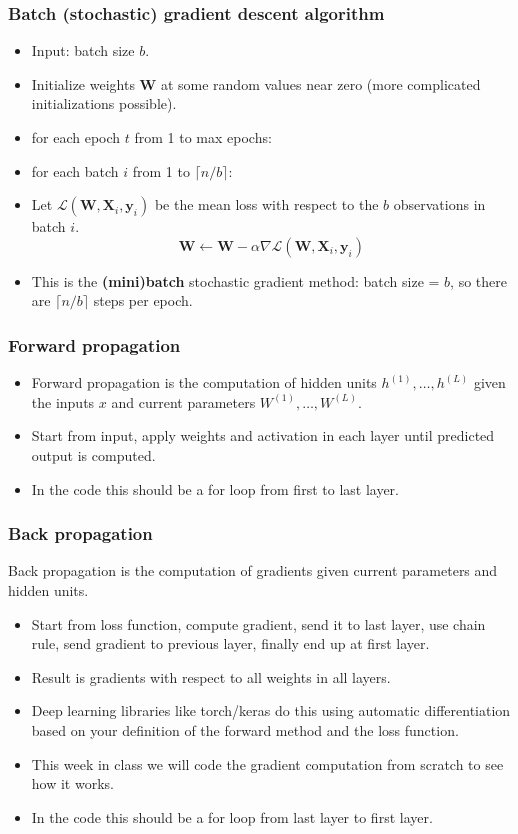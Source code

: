 \documentclass{beamer}
\begin{document}
\begin{frame}[fragile]
  \frametitle{Batch (stochastic) gradient descent algorithm}
  \begin{itemize}
  \item Input: batch size $b$.
  \item Initialize weights $\mathbf W$ at some random values near
    zero (more complicated initializations possible).
  \item for each epoch $t$ from 1 to max epochs:
  \item for each batch $i$ from 1 to $\lceil n/b \rceil$:
  \item Let $\mathcal L( \mathbf W, \mathbf X_i, \mathbf y_i )$ be the
    mean loss with respect to the $b$ observations in batch $i$.
  $$
\mathbf W \gets \mathbf W - \alpha \nabla \mathcal L(\mathbf W, \mathbf X_i, \mathbf y_i)
$$
\item This is the \textbf{(mini)batch} stochastic gradient method:
  batch size = $b$, so there are $\lceil n/b \rceil$ steps per epoch.
\end{itemize}

\end{frame}

\begin{frame}[fragile]
  \frametitle{Forward propagation}
  \begin{itemize}
\item Forward propagation is the computation of hidden units
$h^{(1)},\dots,h^{(L)}$ given the inputs $x$ and current parameters
$W^{(1)},\dots,W^{(L)}$.
\item Start from input, apply weights and activation in each layer until
  predicted output is computed.
\item In the code this should be a for loop from first to last layer.
  \end{itemize}
\end{frame}

\begin{frame}[fragile]
  \frametitle{Back propagation}
Back propagation is the computation of gradients given current
parameters and hidden units.
\begin{itemize}
\item Start from loss function, compute gradient, send it to last
  layer, use chain rule, send gradient to previous layer, finally end
  up at first layer.
\item Result is gradients with respect to all weights in all layers.
\item Deep learning libraries like torch/keras do this using automatic
  differentiation based on your definition of the forward method and
  the loss function.
\item This week in class we will code the gradient computation from
  scratch to see how it works.
\item In the code this should be a for loop from last layer to first
  layer.
\end{itemize}


\end{frame}
\end{document}
